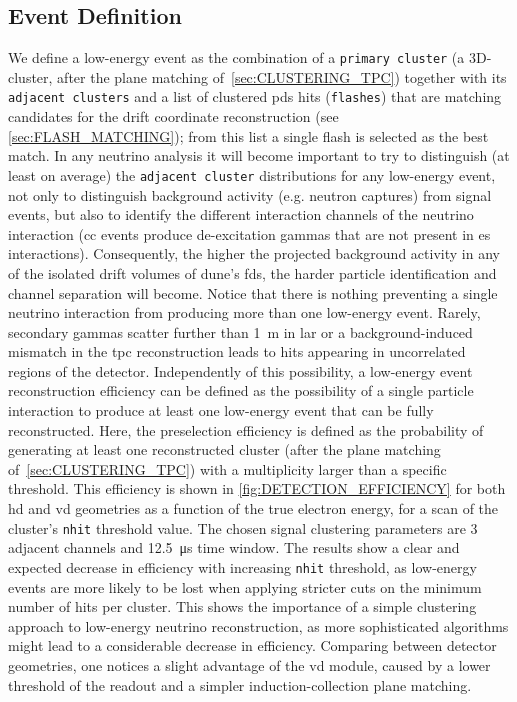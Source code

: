 \subsection{Event Definition}\label{sec:EVENT_DEFINITION}
We define a low-energy event as the combination of a \texttt{primary cluster} (a 3D-cluster, after the plane matching of~\cref{sec:CLUSTERING_TPC}) together with its \texttt{adjacent clusters} and a list of clustered \gls{pds} hits (\texttt{flashes}) that are matching candidates for the drift coordinate reconstruction (see \cref{sec:FLASH_MATCHING}); from this list a single flash is selected as the best match. In any neutrino analysis it will become important to try to distinguish (at least on average) the \texttt{adjacent cluster} distributions for any low-energy event, not only to distinguish background activity (e.g. neutron captures) from signal events, but also to identify the different interaction channels of the neutrino interaction (\gls{cc} events produce de-excitation gammas that are not present in \gls{es} interactions). Consequently, the higher the projected background activity in any of the isolated drift volumes of \gls{dune}'s \gls{fd}s, the harder particle identification and channel separation will become. Notice that there is nothing preventing a single neutrino interaction from producing more than one low-energy event. Rarely, secondary gammas scatter further than \SI{1}{\meter} in \gls{lar} or a background-induced mismatch in the \gls{tpc} reconstruction leads to hits appearing in uncorrelated regions of the detector. Independently of this possibility, a low-energy event reconstruction efficiency can be defined as the possibility of a single particle interaction to produce at least one low-energy event that can be fully reconstructed. Here, the preselection efficiency is defined as the probability of generating at least one reconstructed cluster (after the plane matching of~\cref{sec:CLUSTERING_TPC}) with a multiplicity larger than a specific threshold. This efficiency is shown in \cref{fig:DETECTION_EFFICIENCY} for both \gls{hd} and \gls{vd} geometries as a function of the true electron energy, for a scan of the cluster's \texttt{nhit} threshold value. The chosen signal clustering parameters are 3 adjacent channels and \SI{12.5}{\micro\second} time window. The results show a clear and expected decrease in efficiency with increasing \texttt{nhit} threshold, as low-energy events are more likely to be lost when applying stricter cuts on the minimum number of hits per cluster. This shows the importance of a simple clustering approach to low-energy neutrino reconstruction, as more sophisticated algorithms might lead to a considerable decrease in efficiency. Comparing between detector geometries, one notices a slight advantage of the \gls{vd} module, caused by a lower threshold of the readout and a simpler induction-collection plane matching.

